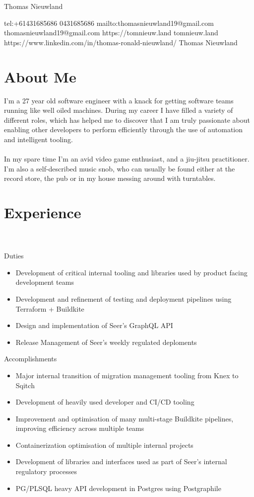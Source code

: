 \documentclass{resume}
\begin{document}
\ContactName
{Thomas Nieuwland}

\ContactInfoDigital
  {tel:+61431685686}
  {0431685686}
  {mailto:thomasnieuwland19@gmail.com}
  {thomasnieuwland19@gmail.com}
  {https://tomnieuw.land}
  {tomnieuw.land}
  {https://www.linkedin.com/in/thomas-ronald-nieuwland/}
  {Thomas Nieuwland}

\section{{\faUser} About Me}
I'm a 27 year old software engineer with a knack for getting software teams running like well oiled machines. During my 
career I have filled a variety of different roles, which has helped me to discover that I am truly passionate about 
enabling other developers to perform efficiently through the use of automation and intelligent tooling.
\\~\\
In my spare time I'm an avid video game enthusiast, and a jiu-jitsu practitioner. I'm also a self-described music
snob, who can usually be found either at the record store, the pub or in my house messing around with turntables.

\section{{\faBriefcase} Experience}
 \\
 \\
Duties \\
\begin{itemize}
  \item Development of critical internal tooling and libraries used by product facing development teams
  \item Development and refinement of testing and deployment pipelines using Terraform + Buildkite
  \item Design and implementation of Seer's GraphQL API
  \item Release Management of Seer's weekly regulated deploments
\end{itemize}
Accomplishments \\
\begin{itemize}
  \item Major internal transition of migration management tooling from Knex to Sqitch
  \item Development of heavily used developer and CI/CD tooling
  \item Improvement and optimisation of many multi-stage Buildkite pipelines, improving efficiency across multiple teams
  \item Containerization optimisation of multiple internal projects
  \item Development of libraries and interfaces used as part of Seer's internal regulatory processes
  \item PG/PLSQL heavy API development in Postgres using Postgraphile
\end{itemize}
\end{document}
